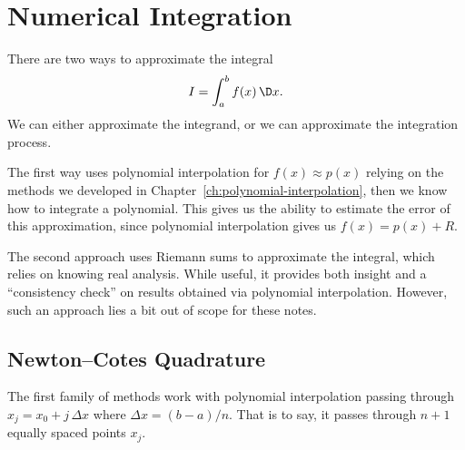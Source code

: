 \section{Numerical Integration}

There are two ways to approximate the integral
\begin{equation}
I = \int^{b}_{a}f(x)\,\D x.
\end{equation}
We can either approximate the integrand, or we can approximate the
integration process.

The first way uses polynomial interpolation for $f(x)\approx p(x)$
relying on the methods we developed in Chapter~\ref{ch:polynomial-interpolation},
then we know how to integrate a polynomial. This gives us the ability to
estimate the error of this approximation, since polynomial interpolation
gives us $f(x)=p(x)+R$.

The second approach uses Riemann sums to approximate the integral, which
relies on knowing real analysis. While useful, it provides both
insight and a ``consistency check'' on results obtained via polynomial
interpolation. However, such an approach lies a bit out of scope for
these notes.

\subsection{Newton--Cotes Quadrature}

The first family of methods work with polynomial interpolation passing
through $x_{j}=x_{0}+j\,\Delta x$ where $\Delta x = (b-a)/n$. That is to
say, it passes through $n+1$ equally spaced points $x_{j}$.

